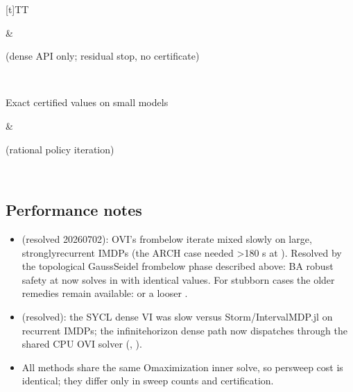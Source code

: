 \documentclass[a4paper,10pt,english]{sphinxmanual}
\begin{document}
\begin{savenotes}
\begin{tabulary}{\linewidth}[t]{TT}
\begin{varwidth}[t]{}
\end{varwidth}%
&\begin{varwidth}[t]{}
\sphinxAtStartPar
{} (dense API only; residual stop, no certificate)
\sphinxbeforeendvarwidth
\end{varwidth}%
\\
\sphinxhline\begin{varwidth}[t]{}
\sphinxAtStartPar
Exact certified values on small models
\sphinxbeforeendvarwidth
\end{varwidth}%
&\begin{varwidth}[t]{}
\sphinxAtStartPar
{\hyperref[\detokenize{manual/exact::doc}]{}} (rational policy iteration)
\sphinxbeforeendvarwidth
\end{varwidth}%
\\
\sphinxbottomrule
\end{tabulary}
\sphinxtableafterendhook\par
\sphinxattableend\end{savenotes}


\subsection{Performance notes}
\label{\detokenize{manual/engines:performance-notes}}\begin{itemize}
\item {} 
\sphinxAtStartPar
{} (resolved 2026\sphinxhyphen{}07\sphinxhyphen{}02): OVI’s from\sphinxhyphen{}below iterate mixed slowly on large,
strongly\sphinxhyphen{}recurrent IMDPs (the ARCH  case needed \textgreater{}180 s at ). Resolved
by the topological Gauss\textendash{}Seidel from\sphinxhyphen{}below phase described above: BA robust safety at
 now solves in  with identical values. For stubborn cases the
older remedies remain available:  or a looser .

\item {} 
\sphinxAtStartPar
{} (resolved): the SYCL dense VI was slow versus Storm/IntervalMDP.jl on
recurrent IMDPs; the infinite\sphinxhyphen{}horizon dense path now dispatches through the shared
CPU OVI solver (, ).

\item {} 
\sphinxAtStartPar
All methods share the same O\sphinxhyphen{}maximization inner solve, so per\sphinxhyphen{}sweep cost is
identical; they differ only in sweep counts and certification.

\end{itemize}
\end{document}

